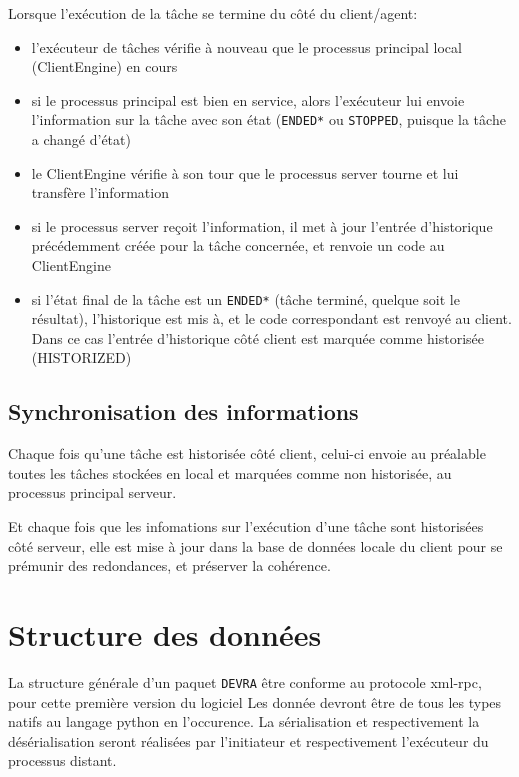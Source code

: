 \documentclass{bouygues-fr}
\begin{document}
Lorsque l'exécution de la tâche se termine du côté du client/agent:
\begin{itemize}
\item l'exécuteur de tâches vérifie à nouveau que le processus principal local (ClientEngine) en cours
\item si le processus principal est bien en service, alors l'exécuteur lui envoie l'information sur la tâche avec son état (\texttt{ENDED*} ou \texttt{STOPPED}, puisque la tâche a changé d'état)
\item le ClientEngine vérifie à son tour que le processus server tourne et lui transfère l'information
\item si le processus server reçoit l'information, il met à jour l'entrée d'historique précédemment créée pour la tâche concernée, et renvoie un code au ClientEngine
\item si l'état final de la tâche est un \texttt{ENDED*} (tâche terminé, quelque soit le résultat), l'historique est mis à, et le code correspondant est renvoyé au client. Dans ce cas l'entrée d'historique côté client est marquée comme historisée (HISTORIZED)
\end{itemize}

\subsection{Synchronisation des informations}
Chaque fois qu'une tâche est historisée côté client, celui-ci envoie au préalable toutes les tâches stockées en local et marquées comme non historisée, au processus principal serveur.

Et chaque fois que les infomations sur l'exécution d'une tâche sont historisées côté serveur, elle est mise à jour dans la base de données locale du client pour se prémunir des redondances, et préserver la cohérence.

\vspace{20pt}
\section{Structure des données}

La structure générale d'un paquet \texttt{DEVRA} être conforme au protocole xml-rpc, pour cette première version du logiciel
Les donnée devront être de tous les types natifs au langage python en l'occurence. La sérialisation et respectivement la désérialisation seront réalisées par l'initiateur et respectivement l'exécuteur du processus distant.

\end{document}
